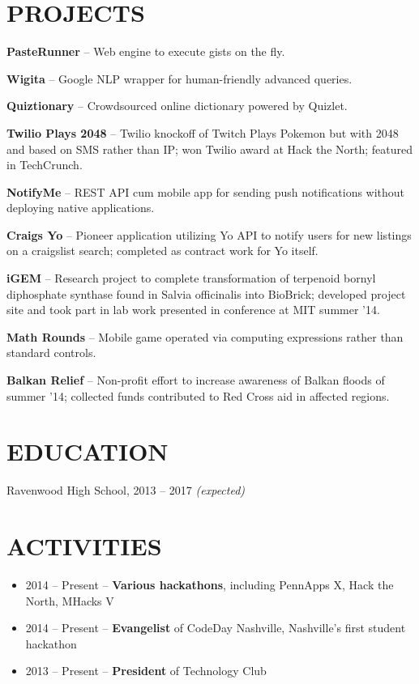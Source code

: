\documentclass{res} %
\begin{document}
\section{PROJECTS}

\textbf{PasteRunner} -- Web engine to execute gists on the fly.

\textbf{Wigita} -- Google NLP wrapper for human-friendly advanced queries.

\textbf{Quiztionary} -- Crowdsourced online dictionary powered by Quizlet.

\textbf{Twilio Plays 2048} -- Twilio knockoff of Twitch Plays Pokemon but with 2048 and based on SMS rather than IP; won Twilio award at Hack the North; featured in TechCrunch.

\textbf{NotifyMe} -- REST API cum mobile app for sending push notifications without deploying native applications.

\textbf{Craigs Yo} -- Pioneer application utilizing Yo API to notify users for new listings on a craigslist search; completed as contract work for Yo itself.

\textbf{iGEM} -- Research project to complete transformation of terpenoid bornyl diphosphate synthase found in Salvia officinalis into BioBrick; developed project site and took part in lab work presented in conference at MIT summer '14.

\textbf{Math Rounds} -- Mobile game operated via computing expressions rather than standard controls.

\textbf{Balkan Relief} -- Non-profit effort to increase awareness of Balkan floods of summer '14; collected funds contributed to Red Cross aid in affected regions.

\section{EDUCATION}

Ravenwood High School, 2013 -- 2017 \textit {(expected)} \\

\section{ACTIVITIES}

\begin{itemize} \itemsep -2pt
  \item 2014 -- Present -- \textbf{Various hackathons}, including PennApps X, Hack the North, MHacks V
  \item 2014 -- Present -- \textbf{Evangelist} of CodeDay Nashville, Nashville's first student hackathon
  \item 2013 -- Present -- \textbf{President} of Technology Club
\end{itemize}
\end{document}
